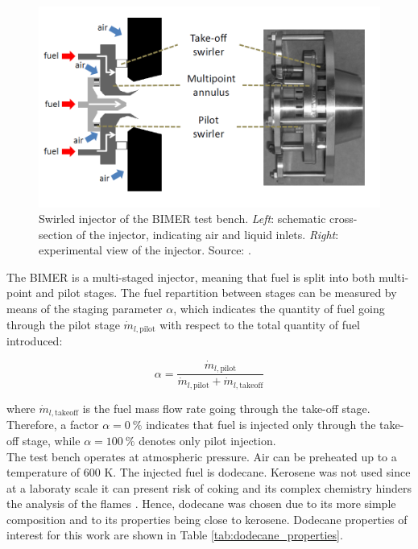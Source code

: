 \begin{figure}[h!]
	\centering
	\includegraphics[scale=0.55]{./part3_applications/figures_ch7_aero/BIMER_swirler}
	\caption[Swirled injector of the BIMER test bench]{Swirled injector of the BIMER test bench. \textsl{Left}: schematic cross-section of the injector, indicating air and liquid inlets. \textsl{Right}: experimental view of the injector. Source: .}
	\label{fig:BIMER_swirler}
\end{figure}

The BIMER is a multi-staged injector, meaning that fuel is split into both multi-point and pilot stages. The fuel repartition between stages can be measured by means of the staging parameter $\alpha$, which indicates the quantity of fuel going through the pilot stage $\dot{m}_{l,\mathrm{pilot}}$ with respect to the total quantity of fuel introduced:

\begin{equation}
\label{eq:BIMER_staging_parameter}
\alpha = \frac{\dot{m}_{l,\mathrm{pilot}}}{\dot{m}_{l,\mathrm{pilot}} + \dot{m}_{l,\mathrm{takeoff}}}
\end{equation}

where $\dot{m}_{l,\mathrm{takeoff}}$ is the fuel mass flow rate going through the take-off stage. Therefore, a factor $\alpha = 0 ~\%$ indicates that fuel is injected only through the take-off stage, while $\alpha = 100 ~\%$ denotes only pilot injection. \\

The test bench operates at atmospheric pressure. Air can be preheated up to a temperature of $600$ K. The injected fuel is dodecane. Kerosene was not used since at a laboraty scale it can present risk of coking and its complex chemistry hinders the analysis of the flames . Hence, dodecane was chosen due to its more simple composition and to its properties being close to kerosene. Dodecane properties of interest for this work are shown in Table \ref{tab:dodecane_properties}.

